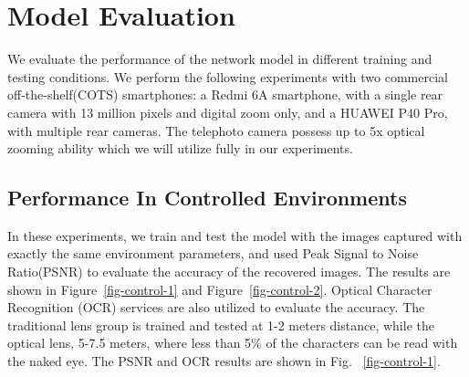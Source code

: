 \section{Model Evaluation}
\label{sec-evaluation}
We evaluate the performance of the network model in different training and testing conditions. We perform the following experiments with two commercial off-the-shelf(COTS) smartphones: a Redmi 6A smartphone, with a single rear camera with 13 million pixels and digital zoom only, and a HUAWEI P40 Pro, with multiple rear cameras. The telephoto camera possess up to 5x optical zooming ability which we will utilize fully in our experiments.
 
\subsection{Performance In Controlled Environments}

In these experiments, we train and test the model with the images captured with exactly the same environment parameters, and used Peak Signal to Noise Ratio(PSNR) to evaluate the accuracy of the recovered images. The results are shown in Figure~\ref{fig-control-1} and Figure~\ref{fig-control-2}. Optical Character Recognition (OCR) services are also utilized to evaluate the accuracy. The traditional lens group is trained and tested at 1-2 meters distance, while the optical lens, 5-7.5 meters, where less than 5\% of the characters can be read with the naked eye. The PSNR and OCR results are shown in Fig. ~\ref{fig-control-1}.

